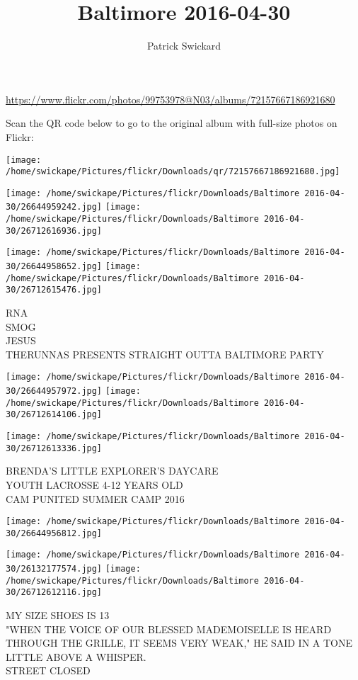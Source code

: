 \documentclass[10pt,letterpaper]{article}
\title{Baltimore 2016-04-30}
\author{Patrick Swickard}
\date{}
\begin{document}
\maketitle

\url{https://www.flickr.com/photos/99753978@N03/albums/72157667186921680}

Scan the QR code below to go to the original album with full-size photos on Flickr:

\texttt{[image: /home/swickape/Pictures/flickr/Downloads/qr/72157667186921680.jpg]}
\pagebreak

\texttt{[image: /home/swickape/Pictures/flickr/Downloads/Baltimore 2016-04-30/26644959242.jpg]}
\texttt{[image: /home/swickape/Pictures/flickr/Downloads/Baltimore 2016-04-30/26712616936.jpg]}

\texttt{[image: /home/swickape/Pictures/flickr/Downloads/Baltimore 2016-04-30/26644958652.jpg]}
\texttt{[image: /home/swickape/Pictures/flickr/Downloads/Baltimore 2016-04-30/26712615476.jpg]}

RNA\\
SMOG\\
JESUS\\
THERUNNAS PRESENTS STRAIGHT OUTTA BALTIMORE PARTY
\pagebreak

\texttt{[image: /home/swickape/Pictures/flickr/Downloads/Baltimore 2016-04-30/26644957972.jpg]}
\texttt{[image: /home/swickape/Pictures/flickr/Downloads/Baltimore 2016-04-30/26712614106.jpg]}

\texttt{[image: /home/swickape/Pictures/flickr/Downloads/Baltimore 2016-04-30/26712613336.jpg]}

BRENDA'S LITTLE EXPLORER'S DAYCARE\\
YOUTH LACROSSE 4{-}12 YEARS OLD\\
CAM PUNITED SUMMER CAMP 2016
\pagebreak

\texttt{[image: /home/swickape/Pictures/flickr/Downloads/Baltimore 2016-04-30/26644956812.jpg]}

\vspace{0.25in}
\texttt{[image: /home/swickape/Pictures/flickr/Downloads/Baltimore 2016-04-30/26132177574.jpg]}
\texttt{[image: /home/swickape/Pictures/flickr/Downloads/Baltimore 2016-04-30/26712612116.jpg]}

MY SIZE SHOES IS 13\\
"WHEN THE VOICE OF OUR BLESSED MADEMOISELLE IS HEARD THROUGH THE GRILLE, IT SEEMS VERY WEAK," HE SAID IN A TONE LITTLE ABOVE A WHISPER.\\
STREET CLOSED
\pagebreak
\end{document}
